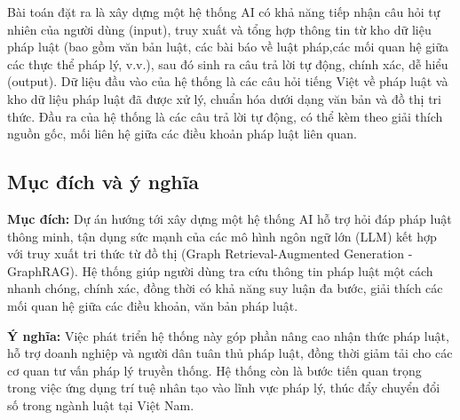 \documentclass[a4paper]{article}
\begin{document}
Bài toán đặt ra là xây dựng một hệ thống AI có khả năng tiếp nhận câu hỏi tự nhiên của người dùng (input), truy xuất và tổng hợp thông tin từ kho dữ liệu pháp luật (bao gồm văn bản luật, các bài báo về luật pháp,các mối quan hệ giữa các thực thể pháp lý, v.v.), sau đó sinh ra câu trả lời tự động, chính xác, dễ hiểu (output). Dữ liệu đầu vào của hệ thống là các câu hỏi tiếng Việt về pháp luật và kho dữ liệu pháp luật đã được xử lý, chuẩn hóa dưới dạng văn bản và đồ thị tri thức. Đầu ra của hệ thống là các câu trả lời tự động, có thể kèm theo giải thích nguồn gốc, mối liên hệ giữa các điều khoản pháp luật liên quan.

\subsection{Mục đích và ý nghĩa}
\textbf{Mục đích:} Dự án hướng tới xây dựng một hệ thống AI hỗ trợ hỏi đáp pháp luật thông minh, tận dụng sức mạnh của các mô hình ngôn ngữ lớn (LLM) kết hợp với truy xuất tri thức từ đồ thị (Graph Retrieval-Augmented Generation - GraphRAG). Hệ thống giúp người dùng tra cứu thông tin pháp luật một cách nhanh chóng, chính xác, đồng thời có khả năng suy luận đa bước, giải thích các mối quan hệ giữa các điều khoản, văn bản pháp luật.

\textbf{Ý nghĩa:} Việc phát triển hệ thống này góp phần nâng cao nhận thức pháp luật, hỗ trợ doanh nghiệp và người dân tuân thủ pháp luật, đồng thời giảm tải cho các cơ quan tư vấn pháp lý truyền thống. Hệ thống còn là bước tiến quan trọng trong việc ứng dụng trí tuệ nhân tạo vào lĩnh vực pháp lý, thúc đẩy chuyển đổi số trong ngành luật tại Việt Nam.
\end{document}
